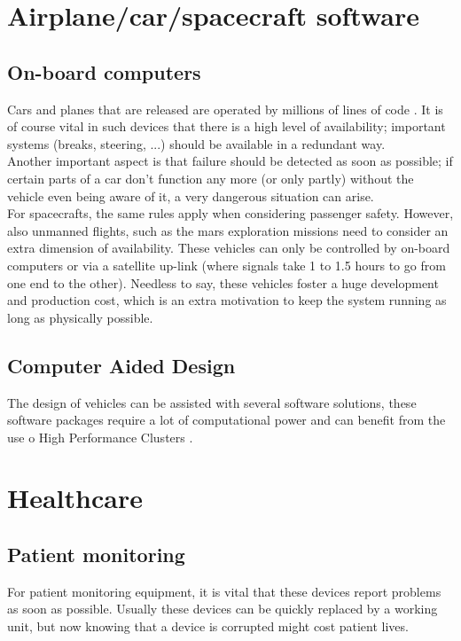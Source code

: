 \documentclass[12pt]{report}
\begin{document}
\section{Airplane/car/spacecraft software}
\subsection{On-board computers}
Cars and planes that are released are operated by millions of lines of code
\cite{ieee_cars_and_planes}. It is of course vital in such devices
that there is a high level of availability; important systems (breaks,
steering, ...) should be available in a redundant way. \\
Another important aspect is that failure should be detected as soon as
possible; if certain parts of a car don't function any more (or only
partly) without the vehicle even being aware of it, a very dangerous
situation can arise.\\
For spacecrafts, the same rules apply when considering passenger
safety. However, also unmanned flights, such as the mars exploration missions
need to consider an extra dimension of availability. These vehicles
can only be controlled by on-board computers or via a satellite
up-link (where signals take 1 to 1.5 hours \cite{mars_rover} to go
from one end to the other). Needless to say, these vehicles foster a
huge development and production cost, which is an extra motivation to
 keep the system running as long as physically possible.
\subsection{Computer Aided Design}
The design of vehicles can be assisted with several software
solutions, these software packages require a lot of computational
power and can benefit from the use o High Performance Clusters
\cite{hpc_cars}.

\section{Healthcare}
\subsection{Patient monitoring}
For patient monitoring equipment, it is vital that these devices
report problems as soon as possible. Usually these devices can be
quickly replaced by a working unit, but now knowing that a device is
corrupted might cost patient lives.\\
\end{document}
